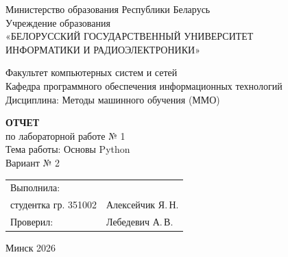\documentclass[14pt,a4paper]{extarticle}
\begin{document}
\begin{titlepage}
    \begin{center}
        Министерство образования Республики Беларусь\\[0.15cm]
        Учреждение образования\\[0.15cm]
        «БЕЛОРУССКИЙ ГОСУДАРСТВЕННЫЙ УНИВЕРСИТЕТ\\
        ИНФОРМАТИКИ И РАДИОЭЛЕКТРОНИКИ»
    \end{center}
    
    \vspace{0.4cm}
    
    \begin{flushleft}
        Факультет компьютерных систем и сетей\\[0.1cm]
        Кафедра программного обеспечения информационных технологий\\[0.1cm]
        Дисциплина: Методы машинного обучения (ММО)
    \end{flushleft}
    
    \vspace{2.2cm}
    
    \begin{center}
        \large\textbf{ОТЧЕТ}\\[0.2cm]
        \normalsize
        {по лабораторной работе № 1}\\[0.3cm]
        Тема работы: Основы Python\\[0.2cm]
        Вариант № 2
    \end{center}
    
    \vspace{2.2cm}
    
    \noindent
    \begin{tabular}{@{}p{}@{}p{}@{}}
        Выполнила: & \\
        студентка гр. 351002 & Алексейчик Я.\,Н. \\[0.5cm]
        Проверил: & Лебедевич А.\,В.
    \end{tabular}
    
    \vfill
    
    \begin{center}
        Минск 2026
    \end{center}
\end{titlepage}
\end{document}
